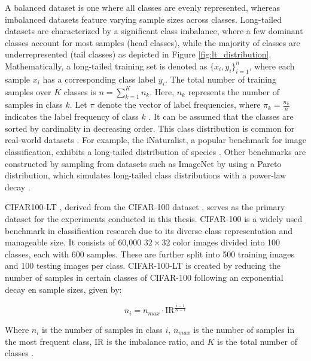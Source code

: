 \noindent A balanced dataset is one where all classes are evenly represented, whereas imbalanced datasets feature varying sample sizes across classes. Long-tailed datasets are characterized by a significant class imbalance, where a few dominant classes account for most samples (head classes), while the majority of classes are underrepresented (tail classes) as depicted in Figure \ref{fig:lt_distribution}. Mathematically, a long-tailed training set is denoted as $\{x_i, y_i\}_{i=1}^n$, where each sample $x_i$ has a corresponding class label $y_i$. The total number of training samples over $K$ classes is $n = \sum_{k=1}^K n_k$. Here, $n_k$ represents the number of samples in class $k$. Let $\pi$ denote the vector of label frequencies, where $\pi_k = \frac{n_k}{n}$ indicates the label frequency of class $k$ \cite{zhang2023deep}. It can be assumed that the classes are sorted by cardinality in decreasing order. This class distribution is common for real-world datasets \cite{Newman_2005, liu2019largescalelongtailedrecognitionopen}. For example, the iNaturalist, a popular benchmark for image classification, exhibits a long-tailed distribution of species \cite{vanhorn2018inaturalistspeciesclassificationdetection}. Other benchmarks are constructed by sampling from datasets such as ImageNet \cite{ImageNet2009} by using a Pareto distribution, which simulates long-tailed class distributions with a power-law decay \cite{zhang2023deep, dealvis2024surveydeeplongtailclassification,cao2019learningimbalanceddatasetslabeldistributionaware}.

CIFAR100-LT \cite{cao2019learningimbalanceddatasetslabeldistributionaware}, derived from the CIFAR-100 dataset \cite{krizhevsky2009learning}, serves as the primary dataset for the experiments conducted in this thesis. CIFAR-100 is a widely used benchmark in classification research due to its diverse class representation and manageable size. It consists of 60,000 $32 \times 32$ color images divided into 100 classes, each with 600 samples. These are further split into 500 training images and 100 testing images per class. CIFAR-100-LT is created by reducing the number of samples in certain classes of CIFAR-100 following an exponential decay en sample sizes, given by:

\begin{equation}
    \label{eq:exp}
    n_i = n_{max}\cdot \text{IR}^{\frac{i-1}{K-1}}
\end{equation}

Where $n_i$ is the number of samples in class $i$, $n_{max}$ is the number of samples in the most frequent class, IR is the imbalance ratio, and $K$ is the total number of classes \cite{cao2019learningimbalanceddatasetslabeldistributionaware}.

